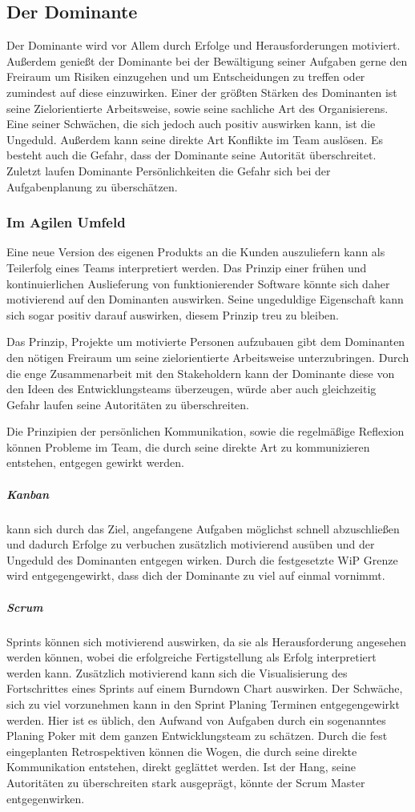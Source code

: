 \documentclass[twocolumn,10pt]{asme2ej}
\begin{document}
\subsection{Der Dominante}
Der Dominante  wird vor Allem durch Erfolge und Herausforderungen motiviert. Außerdem genießt der Dominante bei der Bewältigung seiner Aufgaben gerne den Freiraum um Risiken einzugehen und um Entscheidungen zu treffen oder zumindest auf diese einzuwirken. Einer der größten Stärken des Dominanten ist seine Zielorientierte Arbeitsweise, sowie seine sachliche Art des Organisierens. Eine seiner Schwächen, die sich jedoch auch positiv auswirken kann, ist die Ungeduld. Außerdem kann seine direkte Art Konflikte im Team auslösen. Es besteht auch die Gefahr, dass der Dominante seine Autorität überschreitet. Zuletzt laufen Dominante Persönlichkeiten die Gefahr sich bei der Aufgabenplanung zu überschätzen.

\subsubsection{Im Agilen Umfeld}
Eine neue Version des eigenen Produkts an die Kunden auszuliefern kann als Teilerfolg eines Teams interpretiert werden. Das Prinzip einer frühen und kontinuierlichen Auslieferung von funktionierender Software könnte sich daher motivierend auf den Dominanten auswirken. Seine ungeduldige Eigenschaft kann sich sogar positiv darauf auswirken, diesem Prinzip treu zu bleiben. 

Das Prinzip, Projekte um motivierte Personen aufzubauen gibt dem Dominanten den nötigen Freiraum um seine  zielorientierte Arbeitsweise unterzubringen. Durch die enge Zusammenarbeit mit den Stakeholdern kann der Dominante diese von den Ideen des Entwicklungsteams überzeugen, würde aber auch gleichzeitig Gefahr laufen seine Autoritäten zu überschreiten. 

Die Prinzipien der persönlichen Kommunikation, sowie die regelmäßige Reflexion können Probleme  im Team, die durch seine direkte Art zu kommunizieren entstehen, entgegen gewirkt werden.   

\subparagraph{Kanban} kann sich durch das Ziel, angefangene Aufgaben möglichst schnell abzuschließen und dadurch Erfolge zu verbuchen zusätzlich motivierend ausüben und der Ungeduld des Dominanten entgegen wirken. Durch die festgesetzte WiP Grenze wird entgegengewirkt, dass dich der Dominante zu viel auf einmal vornimmt. 

\subparagraph{Scrum} Sprints können sich motivierend auswirken, da sie als Herausforderung angesehen werden können, wobei die erfolgreiche Fertigstellung als Erfolg interpretiert werden kann. Zusätzlich motivierend kann sich die Visualisierung des Fortschrittes eines Sprints auf einem Burndown Chart auswirken. Der Schwäche, sich zu viel vorzunehmen kann in den Sprint Planing Terminen entgegengewirkt werden. Hier ist es üblich, den Aufwand von Aufgaben durch ein sogenanntes Planing Poker mit dem ganzen Entwicklungsteam zu schätzen. Durch die fest eingeplanten Retrospektiven können die Wogen, die durch seine direkte Kommunikation entstehen, direkt geglättet werden. Ist der Hang, seine Autoritäten zu überschreiten stark ausgeprägt, könnte der Scrum Master entgegenwirken.
\end{document}
